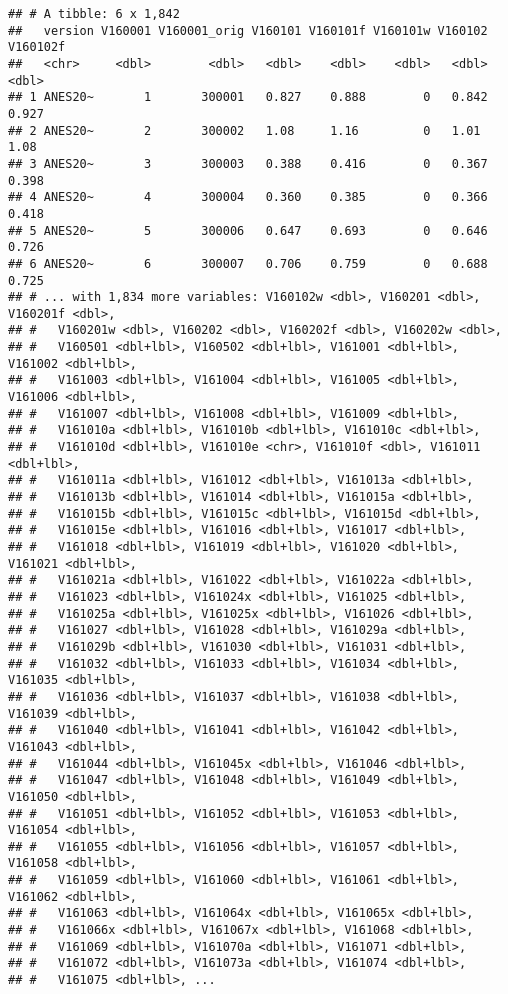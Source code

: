 \documentclass[
]{article}
\begin{document}
\begin{verbatim}
## # A tibble: 6 x 1,842
##   version V160001 V160001_orig V160101 V160101f V160101w V160102 V160102f
##   <chr>     <dbl>        <dbl>   <dbl>    <dbl>    <dbl>   <dbl>    <dbl>
## 1 ANES20~       1       300001   0.827    0.888        0   0.842    0.927
## 2 ANES20~       2       300002   1.08     1.16         0   1.01     1.08 
## 3 ANES20~       3       300003   0.388    0.416        0   0.367    0.398
## 4 ANES20~       4       300004   0.360    0.385        0   0.366    0.418
## 5 ANES20~       5       300006   0.647    0.693        0   0.646    0.726
## 6 ANES20~       6       300007   0.706    0.759        0   0.688    0.725
## # ... with 1,834 more variables: V160102w <dbl>, V160201 <dbl>, V160201f <dbl>,
## #   V160201w <dbl>, V160202 <dbl>, V160202f <dbl>, V160202w <dbl>,
## #   V160501 <dbl+lbl>, V160502 <dbl+lbl>, V161001 <dbl+lbl>, V161002 <dbl+lbl>,
## #   V161003 <dbl+lbl>, V161004 <dbl+lbl>, V161005 <dbl+lbl>, V161006 <dbl+lbl>,
## #   V161007 <dbl+lbl>, V161008 <dbl+lbl>, V161009 <dbl+lbl>,
## #   V161010a <dbl+lbl>, V161010b <dbl+lbl>, V161010c <dbl+lbl>,
## #   V161010d <dbl+lbl>, V161010e <chr>, V161010f <dbl>, V161011 <dbl+lbl>,
## #   V161011a <dbl+lbl>, V161012 <dbl+lbl>, V161013a <dbl+lbl>,
## #   V161013b <dbl+lbl>, V161014 <dbl+lbl>, V161015a <dbl+lbl>,
## #   V161015b <dbl+lbl>, V161015c <dbl+lbl>, V161015d <dbl+lbl>,
## #   V161015e <dbl+lbl>, V161016 <dbl+lbl>, V161017 <dbl+lbl>,
## #   V161018 <dbl+lbl>, V161019 <dbl+lbl>, V161020 <dbl+lbl>, V161021 <dbl+lbl>,
## #   V161021a <dbl+lbl>, V161022 <dbl+lbl>, V161022a <dbl+lbl>,
## #   V161023 <dbl+lbl>, V161024x <dbl+lbl>, V161025 <dbl+lbl>,
## #   V161025a <dbl+lbl>, V161025x <dbl+lbl>, V161026 <dbl+lbl>,
## #   V161027 <dbl+lbl>, V161028 <dbl+lbl>, V161029a <dbl+lbl>,
## #   V161029b <dbl+lbl>, V161030 <dbl+lbl>, V161031 <dbl+lbl>,
## #   V161032 <dbl+lbl>, V161033 <dbl+lbl>, V161034 <dbl+lbl>, V161035 <dbl+lbl>,
## #   V161036 <dbl+lbl>, V161037 <dbl+lbl>, V161038 <dbl+lbl>, V161039 <dbl+lbl>,
## #   V161040 <dbl+lbl>, V161041 <dbl+lbl>, V161042 <dbl+lbl>, V161043 <dbl+lbl>,
## #   V161044 <dbl+lbl>, V161045x <dbl+lbl>, V161046 <dbl+lbl>,
## #   V161047 <dbl+lbl>, V161048 <dbl+lbl>, V161049 <dbl+lbl>, V161050 <dbl+lbl>,
## #   V161051 <dbl+lbl>, V161052 <dbl+lbl>, V161053 <dbl+lbl>, V161054 <dbl+lbl>,
## #   V161055 <dbl+lbl>, V161056 <dbl+lbl>, V161057 <dbl+lbl>, V161058 <dbl+lbl>,
## #   V161059 <dbl+lbl>, V161060 <dbl+lbl>, V161061 <dbl+lbl>, V161062 <dbl+lbl>,
## #   V161063 <dbl+lbl>, V161064x <dbl+lbl>, V161065x <dbl+lbl>,
## #   V161066x <dbl+lbl>, V161067x <dbl+lbl>, V161068 <dbl+lbl>,
## #   V161069 <dbl+lbl>, V161070a <dbl+lbl>, V161071 <dbl+lbl>,
## #   V161072 <dbl+lbl>, V161073a <dbl+lbl>, V161074 <dbl+lbl>,
## #   V161075 <dbl+lbl>, ...
\end{verbatim}
\end{document}
